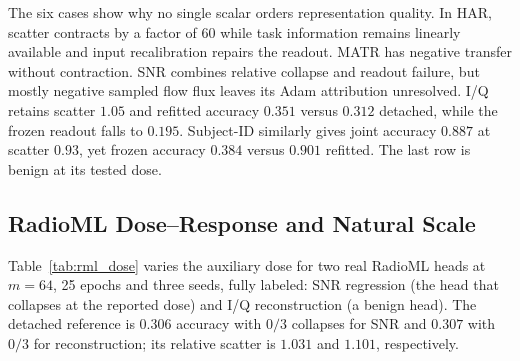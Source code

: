 \documentclass{article}
\begin{document}
The six cases show why no single scalar orders representation quality. In HAR, scatter contracts by a factor of $60$ while task information remains linearly available and input recalibration repairs the readout. MATR has negative transfer without contraction. SNR combines relative collapse and readout failure, but mostly negative sampled flow flux leaves its Adam attribution unresolved. I/Q retains scatter $1.05$ and refitted accuracy $0.351$ versus $0.312$ detached, while the frozen readout falls to $0.195$. Subject-ID similarly gives joint accuracy $0.887$ at scatter $0.93$, yet frozen accuracy $0.384$ versus $0.901$ refitted. The last row is benign at its tested dose.

\subsection{RadioML Dose--Response and Natural Scale}\label{app:rml_dose}

Table~\ref{tab:rml_dose} varies the auxiliary dose for two real RadioML heads at $m=64$, 25 epochs and three seeds, fully labeled: SNR regression (the head that collapses at the reported dose) and I/Q reconstruction (a benign head). The detached reference is $0.306$ accuracy with $0/3$ collapses for SNR and $0.307$ with $0/3$ for reconstruction; its relative scatter is $1.031$ and $1.101$, respectively.

\begin{table}[h]
\centering
\caption{RadioML dose--response, fully labeled. Joint training, three seeds, $m=64$. ``Coll.'' is the scatter-collapse count; $\alpha\rho$ is the nominal dose times the measured per-example radial ratio. The SNR onset lies between $\alpha=3$ and $10$, and the head collapses in every seed from $\alpha=30$ onward; the reconstruction head never collapses at any tested dose.}
\label{tab:rml_dose}
\footnotesize
{}
\end{table}
\end{document}

